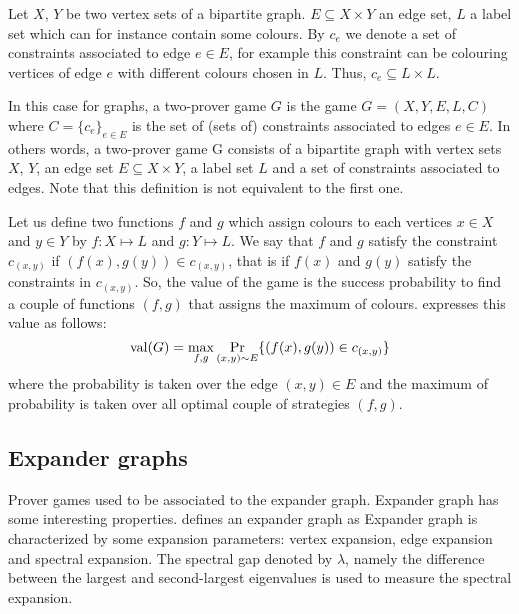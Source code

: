 Let $X$, $Y$ be two vertex sets of a bipartite graph. $E\subseteq X \times Y$ an edge set, $L$ a label set which can for instance contain some colours. By $c_e$ we denote a set of constraints associated to edge $e \in E$, for example  this constraint can be colouring vertices of edge $e$ with different colours chosen in $L$. Thus, $c_e \subseteq L \times L$.

In this case for graphs, a two-prover game $G$ is the game $G=(X,Y,E,L,C)$ where $C=\{c_e\}_{e\in E}$ is the set of (sets of) constraints associated to edges $e \in E$.
In others words, a two-prover game G consists of a bipartite graph with vertex
sets $X$, $Y$, an edge set $ E \subseteq X \times Y$, a label set $L$ and a set of constraints associated to edges. Note that this definition is not equivalent to the first one.


Let us define two functions $f$ and $g$ which assign colours to each vertices  $x \in X$ and $y \in Y$ by $f: X\longmapsto L$ and $g: Y\longmapsto L$. We say that $f$ and $g$ satisfy the constraint $c_{(x,y)}$ if $(f(x),g(y)) \in c_{(x,y)}$, that is if $f(x)$ and $g(y)$ satisfy the constraints in $c_{(x,y)}$. So, the value of the game is the success probability to find a couple of functions $(f,g)$ that assigns the maximum of colours.
\cite{tamaki2015parallel} expresses this value as follows: 
 $$\mathrm{val} (G)=\max_{f,g}\underset{(x,y)\sim E}\Pr  \{(f(x),g(y)) \in c_{(x,y)} \}$$
where the probability is taken over the edge $(x,y) \in E$ and the maximum of probability is taken over all optimal couple of strategies $(f,g).$

\subsection{Expander graphs}

Prover games used to be associated to the expander graph. Expander graph has some interesting properties. 
\cite{nielsen2005introduction} defines an expander graph as  Expander graph is characterized by some expansion parameters: vertex expansion, edge expansion and spectral expansion. The spectral gap denoted by $\lambda$, namely the difference between the largest and second-largest eigenvalues is used to measure the spectral expansion. 

